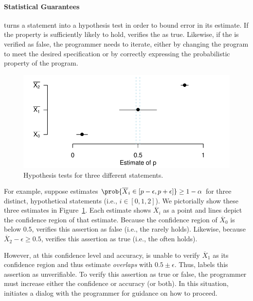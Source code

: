 \paragraph{Statistical Guarantees}

\tool turns a \passert statement into
a hypothesis test in order to
bound error in its estimate. If the property is sufficiently likely
to hold, \tool verifies the \passert as true.  Likewise, if the \passert is
verified as false,
the programmer needs to iterate, either by changing
the program to meet the desired specification or by correctly expressing the
probabilistic property of the program.

\begin{figure}
    \centering
    \includegraphics[width=0.75\columnwidth]{figs/verification}
    \caption{Hypothesis tests for three different \passert statements.}
    \label{passert:fig:verify}
\end{figure}
For example, suppose \tool estimates $\prob{\overline{X}_i \in \left[p - \epsilon,
p + \epsilon\right]} \ge 1 - \alpha$ for three distinct, hypothetical \passert statements
(i.e., $i \in [0,1,2]$). We pictorially show these three estimates in
Figure~\ref{passert:fig:verify}. Each estimate shows $\overline{X}_i$ as a point
and lines depict the confidence region of that estimate.  
Because the confidence region of $\overline{X}_0$ is below $0.5$, \tool verifies
this assertion as false (i.e., the \passert rarely holds).  
Likewise, because $\overline{X}_2 - \epsilon \ge 0.5$, \tool verifies this
assertion as true (i.e., the \passert often holds).

However, at this confidence level and accuracy, \tool is unable to
verify $\overline{X}_1$ as its confidence region and thus estimate \emph{overlaps} with $0.5 \pm \epsilon$.  Thus, \tool
labels this assertion as unverifiable.  To verify this assertion as
true or false, the programmer must increase either the
confidence or accuracy (or both).  In this situation, \tool initiates
a dialog with the programmer for guidance on how to proceed.

